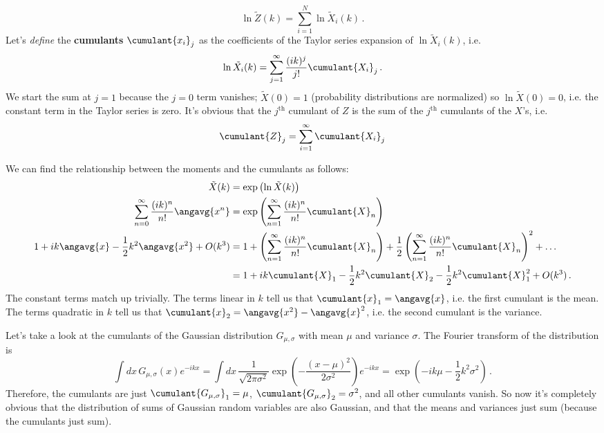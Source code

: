 \begin{equation*}
  \ln \tilde{Z}(k) = \sum_{i=1}^N \ln \tilde{X}_i(k)
  \, .
\end{equation*}
Let's \emph{define} the \textbf{cumulants} $\cumulant{x_i}_j$ as the coefficients of the Taylor series expansion of $\ln \tilde{X}_i(k)$, i.e.
\begin{equation*}
  \ln \tilde{X_i}(k) = \sum_{j=1}^\infty \frac{(ik)^j}{j!} \cumulant{X_i}_j
  \, .
\end{equation*}
We start the sum at $j=1$ because the $j=0$ term vanishes; $\tilde{X}(0) = 1$ (probability distributions are normalized) so $\ln \tilde{X}(0) = 0$, i.e. the constant term in the Taylor series is zero.
It's obvious that the $j^\text{th}$ cumulant of $Z$ is the sum of the $j^\text{th}$ cumulants of the $X$'s, i.e.
\begin{equation*}
  \cumulant{Z}_j = \sum_{i=1}^\infty \cumulant{X_i}_j
\end{equation*}


We can find the relationship between the moments and the cumulants as follows:
\begin{align*}
  \tilde{X}(k) &= \exp \left( \ln \tilde{X}(k) \right) \\
  \sum_{n=0}^\infty \frac{(ik)^n}{n!} \angavg{x^n} &= \exp \left( \sum_{n=1}^\infty \frac{(ik)^n}{n!} \cumulant{X}_n \right) \\
  1 + i k \angavg{x} - \frac{1}{2} k^2 \angavg{x^2} + O(k^3) &= 1
    + \left( \sum_{n=1}^\infty \frac{(ik)^n}{n!} \cumulant{X}_n \right)
    + \frac{1}{2} \left( \sum_{n=1}^\infty \frac{(ik)^n}{n!} \cumulant{X}_n \right)^2 + \ldots \\
  &= 1 + i k \cumulant{X}_1 - \frac{1}{2} k^2 \cumulant{X}_2 - \frac{1}{2} k^2 \cumulant{X}_1^2 + O(k^3)
  \, .
\end{align*}
The constant terms match up trivially.
The terms linear in $k$ tell us that $\cumulant{x}_1 = \angavg{x}$, i.e. the first cumulant is the mean.
The terms quadratic in $k$ tell us that $\cumulant{x}_2 = \angavg{x^2} - \angavg{x}^2$, i.e. the second cumulant is the variance.

Let's take a look at the cumulants of the Gaussian distribution $G_{\mu,\sigma}$ with mean $\mu$ and variance $\sigma$.
The Fourier transform of the distribution is
\begin{equation*}
  \int dx \, G_{\mu, \sigma}(x) e^{-i k x}
  = \int dx \, \frac{1}{\sqrt{2 \pi \sigma^2}} \exp \left( - \frac{(x - \mu)^2}{2 \sigma^2} \right) e^{-i k x}
  = \exp \left(-i k \mu - \frac{1}{2} k^2 \sigma^2 \right)
  \, .
\end{equation*}
Therefore, the cumulants are just $\cumulant{G_{\mu,\sigma}}_1 = \mu$, $\cumulant{G_{\mu, \sigma}}_2 = \sigma^2$, and all other cumulants vanish.
So now it's completely obvious that the distribution of sums of Gaussian random variables are also Gaussian, and that the means and variances just sum (because the cumulants just sum).

